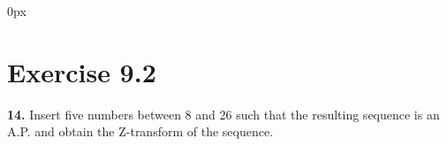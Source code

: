 \documentclass[journal,12pt,twocolumn]{IEEEtran}
\begin{document}
\parindent 0px


\vspace{3cm}

\title{}
\author{EE23BTECH11208 - Manohar K$^{*}$
}
\maketitle
\newpage
\bigskip


\section*{Exercise 9.2}

\noindent \textbf{14.} \hspace{2pt} Insert five numbers between 8 and 26 such that the resulting sequence is an A.P. and obtain the Z-transform of the sequence.
\end{document}

